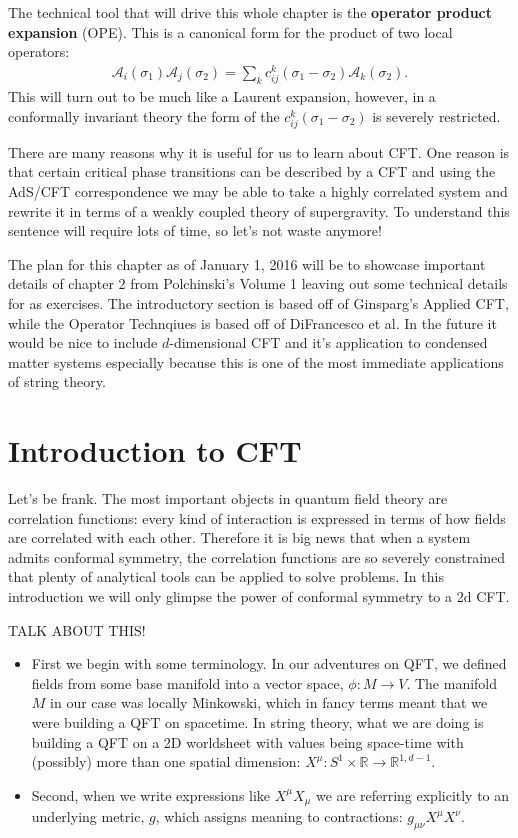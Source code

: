 \documentclass{report}
\theoremstyle{plain}
\theoremstyle{definition}
\theoremstyle{remark}
\newcommand{\mc}{\mathcal}
\newcommand{\sg}{\sigma}
\newcommand{\colr}[1]{ {\color{red} #1 } }
\newcommand{\bR}{\mathbb{R}}
\begin{document}
The technical tool that will drive this whole chapter is the
\textbf{operator product expansion} (OPE). This is a canonical form
for the product of two local operators:
\begin{align}
\mc A_i(\sg_1)\mc A_j(\sg_2) = \sum_k c^k_{ij}(\sg_1-\sg_2) \mc A_k(\sg_2).
\label{OPEdefinition}
\end{align}
This will turn out to be much like a Laurent expansion, however, in a
conformally invariant theory the form of the $c^k_{ij}(\sg_1-\sg_2)$ is
severely restricted. 

There are many reasons why it is useful for us to learn about CFT. One
reason is that certain critical phase transitions can be described by a CFT
and using the AdS/CFT correspondence we may be able to take a highly
correlated system and rewrite it in terms of a weakly coupled theory of
supergravity. To understand this sentence will require lots of time, so
let's not waste anymore! 

The plan for this chapter as of January 1, 2016 will be to showcase
important details of chapter $2$ from Polchinski's Volume 1 leaving out
some technical details for as exercises. The introductory section is based
off of Ginsparg's Applied CFT, while the Operator Technqiues is based off
of DiFrancesco et al. In the future it would be nice to include
$d$-dimensional CFT and it's application to condensed matter systems
especially because this is one of the most immediate applications of string
theory.

\section{Introduction to CFT}
Let's be frank. The most important objects in quantum field theory are
correlation functions: every kind of interaction is expressed in terms of
how fields are correlated with each other. Therefore it is big news that
when a system admits conformal symmetry, the correlation functions are so
severely constrained that plenty of analytical tools can be applied to
solve problems. In this introduction we will only glimpse the power of
conformal symmetry to a 2d CFT.

\colr{TALK ABOUT THIS!}
\begin{itemize}
\item 
   First we begin with some terminology. In our adventures on QFT, we defined
   fields from some base manifold into a vector space, $\phi : M \to V$. The
   manifold $M$ in our case was locally Minkowski, which in fancy terms meant
   that we were building a QFT on spacetime. In string theory, what we are
   doing is building a QFT on a 2D worldsheet with values being space-time
   with (possibly) more than one spatial dimension: $X^\mu : S^1\times \bR \to
   \bR^{1,d-1}$.

\item 
   Second, when we write expressions like $X^\mu X_\mu$ we are referring
   explicitly to an underlying metric, $g$, which assigns meaning to
   contractions: $g_{\mu\nu} X^\mu X^\nu$.
\end{itemize}
\end{document}
